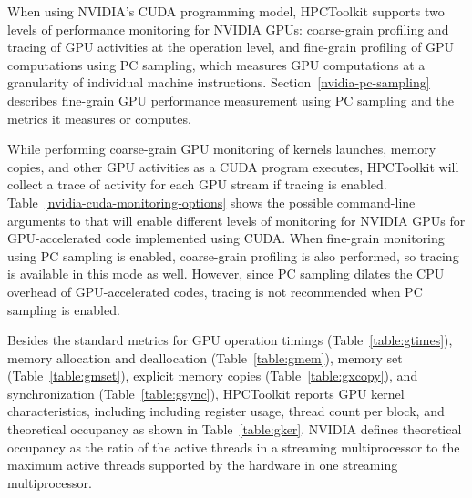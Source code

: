 When using NVIDIA's CUDA programming model, HPCToolkit supports two levels of performance monitoring for NVIDIA GPUs: coarse-grain profiling and tracing of GPU activities at the operation level, and fine-grain profiling of GPU computations using PC sampling, which measures GPU computations at a granularity of individual machine instructions. Section~\ref{nvidia-pc-sampling} describes fine-grain GPU performance measurement using PC sampling and the metrics it measures or computes. 

While performing coarse-grain GPU monitoring of kernels launches, memory copies, and other GPU activities as a CUDA program executes, HPCToolkit will collect a trace of activity for each GPU stream if tracing is enabled. Table~\ref{nvidia-cuda-monitoring-options} shows the possible command-line arguments to \hpcrun{} that will enable different levels of monitoring  for NVIDIA GPUs for GPU-accelerated code implemented using CUDA. When fine-grain monitoring using PC sampling is enabled, coarse-grain profiling is also performed, so tracing is available in this mode as well. However, since PC sampling dilates the CPU overhead of GPU-accelerated codes, tracing is not recommended when PC sampling is enabled.

Besides the standard metrics for GPU operation timings (Table~\ref{table:gtimes}), memory allocation and deallocation (Table~\ref{table:gmem}), memory set (Table~\ref{table:gmset}), explicit memory copies (Table~\ref{table:gxcopy}), and synchronization (Table~\ref{table:gsync}), HPCToolkit reports GPU kernel characteristics, including including register usage,  thread count per block, and theoretical occupancy as shown in Table~\ref{table:gker}. NVIDIA defines theoretical occupancy as the ratio of the active threads in a streaming multiprocessor to the maximum active threads supported by the hardware in one streaming multiprocessor.





